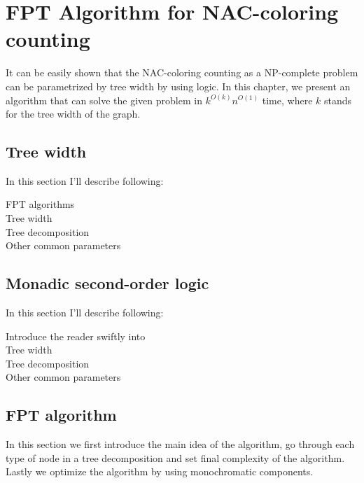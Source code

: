 \chapter{FPT Algorithm for NAC-coloring counting}

\begin{chapterabstract}

	It can be easily shown that the NAC-coloring counting as a NP-complete
	problem can be parametrized by tree width by using \MSO{} logic.
	In this chapter, we present an algorithm that can solve the given problem
	in \({k}^{O(k)} n^{O(1)}\) time, where \(k\) stands for the tree width of the graph.

\end{chapterabstract}

\section{Tree width}

In this section I'll describe following:
\begin{description}
	\item[FPT algorithms]
	\item[Tree width]
	\item[Tree decomposition]
	\item[Other common parameters]
\end{description}

\section{Monadic second-order logic}

In this section I'll describe following:

\begin{description}
	\item[Introduce the reader swiftly into~\MSO]
	\item[Tree width]
	\item[Tree decomposition]
	\item[Other common parameters]
\end{description}

\section{FPT algorithm}

In this section we first introduce the main idea of the algorithm,
go through each type of node in a tree decomposition and
set final complexity of the algorithm.
Lastly we optimize the algorithm by using monochromatic components.

